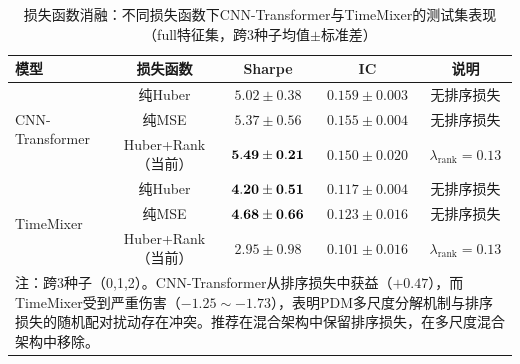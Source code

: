 \begin{table}[H]
\centering
\caption{损失函数消融：不同损失函数下CNN-Transformer与TimeMixer的测试集表现（full特征集，跨3种子均值$\pm$标准差）}
\label{tab:loss_ablation}
\small
\setlength{\tabcolsep}{3pt}
\begin{tabular}{lcccc}
\toprule
模型 & 损失函数 & Sharpe & IC & 说明 \\
\midrule
\multirow{3}{*}{CNN-Transformer}
   & 纯Huber & $5.02\pm0.38$ & $0.159\pm0.003$ & 无排序损失 \\
   & 纯MSE   & $5.37\pm0.56$ & $0.155\pm0.004$ & 无排序损失 \\
   & Huber+Rank（当前）& $\bf 5.49\pm0.21$ & $0.150\pm0.020$ & $\lambda_{\text{rank}}=0.13$ \\
\midrule
\multirow{3}{*}{TimeMixer}
   & 纯Huber & $\bf 4.20\pm0.51$ & $0.117\pm0.004$ & 无排序损失 \\
   & 纯MSE   & $\bf 4.68\pm0.66$ & $0.123\pm0.016$ & 无排序损失 \\
   & Huber+Rank（当前）& $2.95\pm0.98$ & $0.101\pm0.016$ & $\lambda_{\text{rank}}=0.13$ \\
\bottomrule
\multicolumn{5}{p{\textwidth}}{\footnotesize 注：跨3种子（0,1,2）。CNN-Transformer从排序损失中获益（$+0.47$），而TimeMixer受到严重伤害（$-1.25\sim-1.73$），表明PDM多尺度分解机制与排序损失的随机配对扰动存在冲突。推荐在混合架构中保留排序损失，在多尺度混合架构中移除。}\\
\end{tabular}
\end{table}
